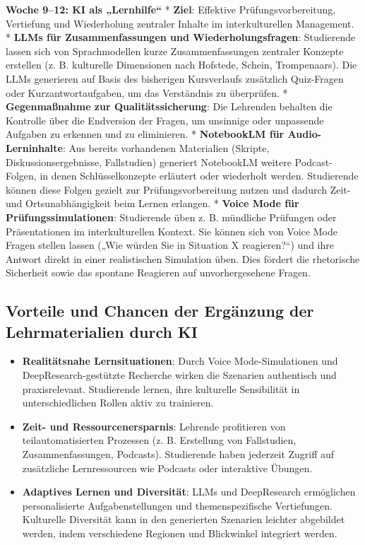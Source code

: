 \documentclass[
  ngerman,
  letterpaper,
  DIV=11]{scrreprt}
\providecommand{\tightlist}{%
  \setlength{\itemsep}{0pt}\setlength{\parskip}{0pt}}
\begin{document}
\textbf{Woche 9--12: KI als „Lernhilfe``} * \textbf{Ziel}: Effektive
Prüfungsvorbereitung, Vertiefung und Wiederholung zentraler Inhalte im
interkulturellen Management. * \textbf{LLMs für Zusammenfassungen und
Wiederholungsfragen}: Studierende lassen sich von Sprachmodellen kurze
Zusammenfassungen zentraler Konzepte erstellen (z. B. kulturelle
Dimensionen nach Hofstede, Schein, Trompenaars). Die LLMs generieren auf
Basis des bisherigen Kursverlaufs zusätzlich Quiz-Fragen oder
Kurzantwortaufgaben, um das Verständnis zu überprüfen. *
\textbf{Gegenmaßnahme zur Qualitätssicherung}: Die Lehrenden behalten
die Kontrolle über die Endversion der Fragen, um unsinnige oder
unpassende Aufgaben zu erkennen und zu eliminieren. * \textbf{NotebookLM
für Audio-Lerninhalte}: Aus bereits vorhandenen Materialien (Skripte,
Diskussionsergebnisse, Fallstudien) generiert NotebookLM weitere
Podcast-Folgen, in denen Schlüsselkonzepte erläutert oder wiederholt
werden. Studierende können diese Folgen gezielt zur Prüfungsvorbereitung
nutzen und dadurch Zeit- und Ortsunabhängigkeit beim Lernen erlangen. *
\textbf{Voice Mode für Prüfungssimulationen}: Studierende üben z. B.
mündliche Prüfungen oder Präsentationen im interkulturellen Kontext. Sie
können sich von Voice Mode Fragen stellen lassen („Wie würden Sie in
Situation X reagieren?{}``) und ihre Antwort direkt in einer
realistischen Simulation üben. Dies fördert die rhetorische Sicherheit
sowie das spontane Reagieren auf unvorhergesehene Fragen.

\subsection{Vorteile und Chancen der Ergänzung der Lehrmaterialien durch
KI}\label{vorteile-und-chancen-der-erguxe4nzung-der-lehrmaterialien-durch-ki}

\begin{itemize}
\tightlist
\item
  \textbf{Realitätsnahe Lernsituationen}: Durch Voice Mode-Simulationen
  und DeepResearch-gestützte Recherche wirken die Szenarien authentisch
  und praxisrelevant. Studierende lernen, ihre kulturelle Sensibilität
  in unterschiedlichen Rollen aktiv zu trainieren.
\item
  \textbf{Zeit- und Ressourcenersparnis}: Lehrende profitieren von
  teilautomatisierten Prozessen (z. B. Erstellung von Fallstudien,
  Zusammenfassungen, Podcasts). Studierende haben jederzeit Zugriff auf
  zusätzliche Lernressourcen wie Podcasts oder interaktive Übungen.
\item
  \textbf{Adaptives Lernen und Diversität}: LLMs und DeepResearch
  ermöglichen personalisierte Aufgabenstellungen und themenspezifische
  Vertiefungen. Kulturelle Diversität kann in den generierten Szenarien
  leichter abgebildet werden, indem verschiedene Regionen und
  Blickwinkel integriert werden.
\end{itemize}
\end{document}
